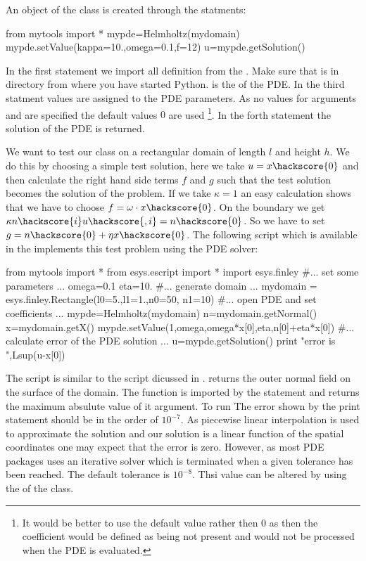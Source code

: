 An object of the  class is created through the statments:
\begin{python}
from mytools import *
mypde=Helmholtz(mydomain)
mypde.setValue(kappa=10.,omega=0.1,f=12)
u=mypde.getSolution()
\end{python}
In the first statement we import all definition from the   . Make sure
that  is in directory from where you have started Python.
 is the \Domain of the PDE. In the third statment values are
assigned to the PDE parameters. As no values for arguments  and  are
specified the default values $0$ are used \footnote{It would be better to use the default value 
 rather then $0$ as then the coefficient would be defined as being not present and
would not be processed when the PDE is evaluated.}. In the forth statement the solution of the
PDE is returned. 

We want to test our  class on a rectangular domain
of length $l$ and height $h$. We do this by choosing a simple test solution,
here we take $u=x\hackscore{0}$ and then calculate the right hand side terms $f$ and $g$ such that
the test solution becomes the solution of the problem. If we take $\kappa=1$ 
an easy calculation shows that we have to choose $f=\omega \cdot x\hackscore{0}$. On the boundary we get
$\kappa n\hackscore{i} u\hackscore{,i}=n\hackscore{0}$.  
So we have to set $g=n\hackscore{0}+\eta x\hackscore{0}$. The following script  
 which is available in the \ExampleDirectory
implements this test problem using the \finley PDE solver:
\begin{python}
from mytools import *
from esys.escript import *
import esys.finley
#... set some parameters ...
omega=0.1
eta=10.
#... generate domain ...
mydomain = esys.finley.Rectangle(l0=5.,l1=1.,n0=50, n1=10)
#... open PDE and set coefficients ...
mypde=Helmholtz(mydomain)
n=mydomain.getNormal()
x=mydomain.getX()
mypde.setValue(1,omega,omega*x[0],eta,n[0]+eta*x[0])
#... calculate error of the PDE solution ...
u=mypde.getSolution()
print "error is ",Lsup(u-x[0])
\end{python}
The script is similar to the script  dicussed in .
 returns the outer normal field on the surface of the domain. The function 
is imported by the  statement and returns the maximum absulute value of it argument. To run 
The error shown by the print statement should be in the order of $10^{-7}$. As piecewise linear interpolation is
used to approximate the solution and our solution is a linear function of the spatial coordinates one may 
expect that the error is zero. However, as most PDE packages uses an iterative solver which is terminated
when a given tolerance has been reached. The default tolerance is $10^{-8}$. Thsi value can be altered by using the 
 of the \LinearPDE class. 

